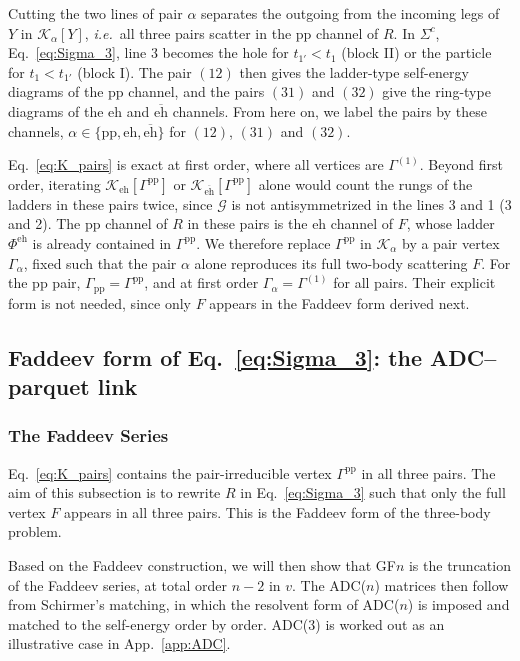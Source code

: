 \documentclass[aip,jcp,reprint,noshowkeys,superscriptaddress]{revtex4-1}
\newcommand{\ie}{\textit{i.e.}}
\newcommand{\cK}{\mathcal{K}}
\newcommand{\eh}{\text{eh}}
\newcommand{\teh}{\overline{\text{eh}}}
\newcommand{\pp}{\text{pp}}
\begin{document}
Cutting the two lines of pair $\alpha$ separates the outgoing from the
incoming legs of $Y$ in $\cK_\alpha[Y]$, \ie\ all three pairs scatter
in the $\pp$ channel of $R$.
In $\Sigma^{c}$, Eq.~\eqref{eq:Sigma_3}, line 3 becomes the hole for
$t_{1'}<t_1$ (block II) or the particle for $t_1<t_{1'}$ (block I). The
pair $(12)$ then gives the ladder-type self-energy diagrams of the $\pp$
channel, and the pairs $(31)$ and $(32)$ give the ring-type diagrams of
the $\eh$ and $\teh$ channels. From here on, we label the pairs by these
channels, $\alpha\in\{\pp,\eh,\teh\}$ for $(12)$, $(31)$ and $(32)$.

Eq.~\eqref{eq:K_pairs} is exact at first order, where all
vertices are $\Gamma^{(1)}$. Beyond first order, iterating $\cK_{\eh}[\Gamma^{\pp}]$ or $\cK_{\teh}[\Gamma^{\pp}]$ alone
would count the rungs of the ladders in these pairs twice,
since $\mathcal G$ is not antisymmetrized in the lines 3 and 1 (3 and 2). The $\pp$ channel of $R$ in these pairs is the $\eh$ channel of $F$, whose ladder $\Phi^{\eh}$ is already contained in $\Gamma^{\pp}$.\cite{Degroote2011} We therefore
replace $\Gamma^{\pp}$ in $\cK_\alpha$ by a pair vertex $\Gamma_\alpha$,
fixed such that the pair $\alpha$ alone reproduces its full two-body
scattering $F$. For the $\pp$ pair, $\Gamma_{\pp}=\Gamma^{\pp}$, and at
first order $\Gamma_\alpha=\Gamma^{(1)}$ for all pairs. Their explicit form is not needed,
since only $F$ appears in the Faddeev form derived next.

\subsection{\label{sec:Faddeev_form}Faddeev form of Eq.~\eqref{eq:Sigma_3}: the ADC--parquet link}
\subsubsection{The Faddeev Series}
Eq.~\eqref{eq:K_pairs} contains the pair-irreducible vertex
$\Gamma^{\pp}$ in all three pairs.
The aim of this subsection is to rewrite $R$ in Eq.~\eqref{eq:Sigma_3} such
that only the full vertex $F$ appears in all three pairs.
This is the Faddeev form of the three-body problem.\cite{Faddeev1961}

Based on the Faddeev construction, we will then show that 
GF$n$ is the truncation of the Faddeev series,
at total order $n-2$ in $v$. 
The ADC($n$) matrices then
follow from Schirmer's matching,\cite{Schirmer1983} in which the
resolvent form of ADC($n$) is imposed and matched to the self-energy
order by order. ADC(3) is worked out as an
illustrative case in App.~\ref{app:ADC}.
\end{document}

